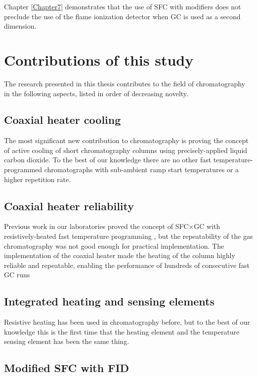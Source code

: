 Chapter \ref{Chapter7} demonstrates that the use of SFC with modifiers does not
preclude the use of the flame ionization detector when GC is used as a second
dimension.

\section{Contributions of this study}

The research presented in this thesis contributes to the field of chromatography
in the following aspects, listed in order of decreasing novelty.

\subsection{Coaxial heater cooling}

The most significant new contribution to chromatography is proving the concept
of active cooling of short chromatography columns using precisely-applied liquid
carbon dioxide. To the best of our knowledge there are no other fast
temperature-programmed chromatographs with sub-ambient ramp start temperatures
or a higher repetition rate.

\subsection{Coaxial heater reliability}

Previous work in our laboratories proved the concept of SFC×GC with
resistively-heated fast temperature programming \autocite{Venter2004,
Venter2006}, but the repeatability of the gas chromatography was not good enough
for practical implementation. The implementation of the coaxial heater made the
heating of the column highly reliable and repeatable, enabling the performance
of hundreds of consecutive fast GC runs

\subsection{Integrated heating and sensing elements}

Resistive heating has been used in chromatography before, but to the best of our
knowledge this is the first time that the heating element and the temperature
sensing element has been the same thing.

\subsection{Modified SFC with FID}

